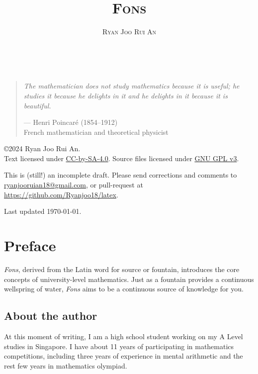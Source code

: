 \documentclass[10pt,a4 paper]{extreport}
\begin{document}
%

\begin{titlepage}
\title{\scshape Fons}
\author{\scshape Ryan Joo Rui An}
\date{}
\end{titlepage}

\maketitle
\pagebreak

\

\vfill

\begin{quote}
\textit{The mathematician does not study mathematics because it is useful; he studies it because he delights in it and he delights in it because it is beautiful.}

\begin{flushright}--- Henri Poincar\'{e} (1854--1912)\\
French mathematician and theoretical physicist\end{flushright}
\end{quote}

\vfill

\copyright 2024 Ryan Joo Rui An.\\
Text licensed under \href{https://creativecommons.org/licenses/by-sa/4.0/}{CC-by-SA-4.0}. Source files licensed under \href{https://choosealicense.com/licenses/gpl-3.0/}{GNU GPL v3}.

This is (still!) an incomplete draft. Please send corrections and comments to \url{ryanjooruian18@gmail.com}, or pull-request at \url{https://github.com/Ryanjoo18/latex}.

Last updated \today.

\chapter*{Preface}
\emph{Fons}, derived from the Latin word for source or fountain, introduces the core concepts of university-level mathematics. Just as a fountain provides a continuous wellspring of water, \emph{Fons} aims to be a continuous source of knowledge for you.

\section*{About the author}
At this moment of writing, I am a high school student working on my A Level studies in Singapore. I have about 11 years of participating in mathematics competitions, including three years of experience in mental arithmetic and the rest few years in mathematics olympiad.
\end{document}
